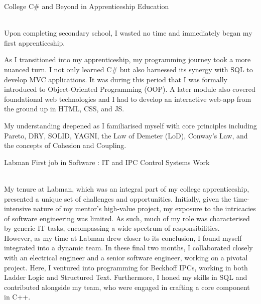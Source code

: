 \begin{entrylist}
{			  
		}
	\entry
		{College}
		{C\# and Beyond in Apprenticeship}
		{Education}
		{\\
			Upon completing secondary school, I wasted no time and immediately began my first apprenticeship.

			As I transitioned into my apprenticeship, my programming journey took a more nuanced turn. I not only learned C\# but also harnessed its synergy with SQL to develop MVC applications. It was during this period that I was formally introduced to Object-Oriented Programming (OOP). A later module also covered foundational web technologies and I had to develop an interactive web-app from the ground up in HTML, CSS, and JS.

			My understanding deepened as I familiarised myself with core principles including Pareto, DRY, SOLID, YAGNI, the Law of Demeter (LoD), Conway's Law, and the concepts of Cohesion and Coupling.

			\vspace{0.5cm}
			    
		}
	\entry
		{Labman}
		{First job in Software : IT and IPC Control Systems}
		{Work}
		{\\
			My tenure at Labman, which was an integral part of my college apprenticeship, presented a unique set of challenges and opportunities. Initially, given the time-intensive nature of my mentor's high-value project, my exposure to the intricacies of software engineering was limited. As such, much of my role was characterised by generic IT tasks, encompassing a wide spectrum of responsibilities. \\

		However, as my time at Labman drew closer to its conclusion, I found myself integrated into a dynamic team. In these final two months, I collaborated closely with an electrical engineer and a senior software engineer, working on a pivotal project. Here, I ventured into programming for Beckhoff IPCs, working in both Ladder Logic and Structured Text. Furthermore, I honed my skills in SQL and contributed alongside my team, who were engaged in crafting a core component in C++.

}
\end{entrylist}
